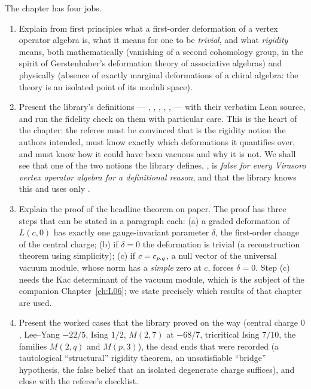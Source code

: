 The chapter has four jobs.
\begin{enumerate}
\item Explain from first principles what a first-order deformation of a vertex operator algebra
  is, what it means for one to be \emph{trivial}, and what \emph{rigidity} means, both
  mathematically (vanishing of a second cohomology group, in the spirit of Gerstenhaber's
  deformation theory of associative algebras) and physically (absence of exactly marginal
  deformations of a chiral algebra: the theory is an isolated point of its moduli space).
\item Present the library's definitions --- , ,
  , , ,  --- with their
  verbatim Lean source, and run the fidelity check on them with particular care. This is the heart
  of the chapter: the referee must be convinced that  is the rigidity notion
  the authors intended, must know exactly which deformations it quantifies over, and must know
  how it could have been vacuous and why it is not. We shall see that one of the two notions the
  library defines, , is \emph{false for every Virasoro vertex operator algebra for a
  definitional reason}, and that the library knows this and uses only .
\item Explain the proof of the headline theorem on paper. The proof has three steps that can be
  stated in a paragraph each: (a) a graded deformation of $L(c,0)$ has exactly one gauge-invariant
  parameter $\delta$, the first-order change of the central charge; (b) if $\delta = 0$ the
  deformation is trivial (a reconstruction theorem using simplicity); (c) if $c = c_{p,q}$, a
  null vector of the universal vacuum module, whose norm has a \emph{simple} zero at $c$, forces
  $\delta = 0$. Step (c) needs the Kac determinant of the vacuum module, which is the subject of the
  companion Chapter~\ref{ch:L06}; we state precisely which results of that chapter are used.
\item Present the worked cases that the library proved on the way (central charge $0$,
  Lee--Yang $-22/5$, Ising $1/2$, $M(2,7)$ at $-68/7$, tricritical Ising $7/10$, the families
  $M(2,q)$ and $M(p,3)$), the dead ends that were recorded (a tautological ``structural''
  rigidity theorem, an unsatisfiable ``bridge'' hypothesis, the false belief that an isolated
  degenerate charge suffices), and close with the referee's checklist.
\end{enumerate}

